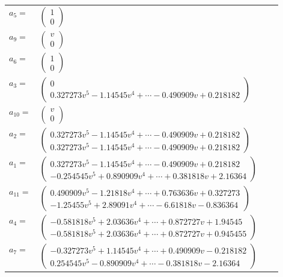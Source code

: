 \documentclass[1p]{elsarticle_modified}
\theoremstyle{definition}
\begin{document}
\begin{tabular}{m{7pt} m{180pt} m{7pt} m{180pt} }
\flushright $a_{5}=$&$\begin{pmatrix}1\\0\end{pmatrix}$ \\
\flushright $a_{9}=$&$\begin{pmatrix}v\\0\end{pmatrix}$ \\
\flushright $a_{6}=$&$\begin{pmatrix}1\\0\end{pmatrix}$ \\
\flushright $a_{3}=$&$\begin{pmatrix}0\\0.327273 v^{5}-1.14545 v^{4}+\cdots-0.490909 v+0.218182\end{pmatrix}$ \\
\flushright $a_{10}=$&$\begin{pmatrix}v\\0\end{pmatrix}$ \\
\flushright $a_{2}=$&$\begin{pmatrix}0.327273 v^{5}-1.14545 v^{4}+\cdots-0.490909 v+0.218182\\0.327273 v^{5}-1.14545 v^{4}+\cdots-0.490909 v+0.218182\end{pmatrix}$ \\
\flushright $a_{1}=$&$\begin{pmatrix}0.327273 v^{5}-1.14545 v^{4}+\cdots-0.490909 v+0.218182\\-0.254545 v^{5}+0.890909 v^{4}+\cdots+0.381818 v+2.16364\end{pmatrix}$ \\
\flushright $a_{11}=$&$\begin{pmatrix}0.490909 v^{5}-1.21818 v^{4}+\cdots+0.763636 v+0.327273\\-1.25455 v^{5}+2.89091 v^{4}+\cdots-6.61818 v-0.836364\end{pmatrix}$ \\
\flushright $a_{4}=$&$\begin{pmatrix}-0.581818 v^{5}+2.03636 v^{4}+\cdots+0.872727 v+1.94545\\-0.581818 v^{5}+2.03636 v^{4}+\cdots+0.872727 v+0.945455\end{pmatrix}$ \\
\flushright $a_{7}=$&$\begin{pmatrix}-0.327273 v^{5}+1.14545 v^{4}+\cdots+0.490909 v-0.218182\\0.254545 v^{5}-0.890909 v^{4}+\cdots-0.381818 v-2.16364\end{pmatrix}$ \\

\end{tabular}
\end{document}
